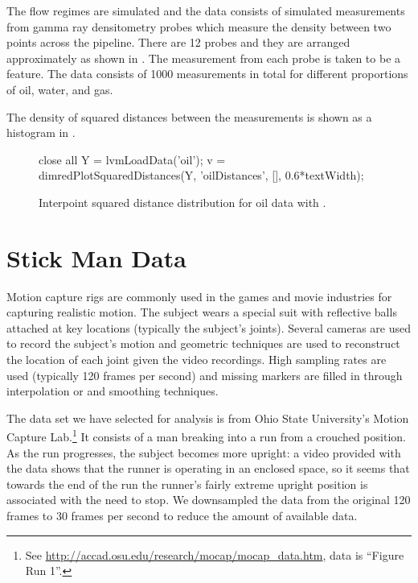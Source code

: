 The flow regimes are simulated and the data consists of simulated
measurements from gamma ray densitometry probes which measure the
density between two points across the pipeline. There are 12 probes
and they are arranged approximately as shown in
. The measurement from each probe is taken to
be a feature. The data consists of 1000 measurements in total for
different proportions of oil, water, and gas.

The density of squared distances between the measurements is shown as
a histogram in .
\begin{figure}
  \begin{matlab}
    close all
    Y = lvmLoadData('oil');
    v = dimredPlotSquaredDistances(Y, 'oilDistances', [], 0.6*textWidth);
  \end{matlab}

  \begin{center}
  \end{center}
  
  \caption{Interpoint squared distance distribution for oil data
    with \captionInfo.}\label{fig:oilDistances}
\end{figure}



\section{Stick Man Data}

Motion capture rigs are commonly used in the games and movie
industries for capturing realistic motion. The subject wears a special
suit with reflective balls attached at key locations (typically the
subject's joints). Several cameras are used to record the subject's
motion and geometric techniques are used to reconstruct the location
of each joint given the video recordings. High sampling rates are used
(typically 120 frames per second) and missing markers are filled in
through interpolation or and smoothing techniques.

The data set we have selected for analysis is from Ohio State
University's Motion Capture Lab.\footnote{See
  \url{http://accad.osu.edu/research/mocap/mocap_data.htm}, data is
  ``Figure Run 1''.} It consists of a man breaking into a run from a
crouched position. As the run progresses, the subject becomes more
upright: a video provided with the data shows that the runner is
operating in an enclosed space, so it seems that towards the end of
the run the runner's fairly extreme upright position is associated
with the need to stop. We downsampled the data from the original 120
frames to 30 frames per second to reduce the amount of available data.

